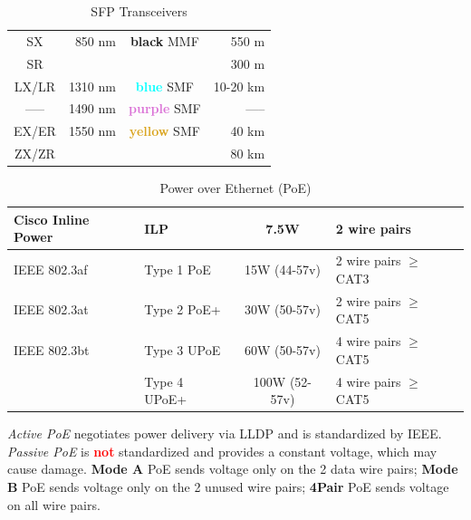 \documentclass[12pt]{article}
\newcommand{\textcolorbf}[2]{\textcolor{#1} {\textbf{#2}}}
\begin{document}
	\begin{table}[H]
	\centering
	\caption{SFP Transceivers \label{tab:SFP}}
	\begin{tabular}{| c | r | c | r |}
	\hline
	SX		& 850 nm		& \textbf{black} MMF				& 550 m\\
	SR		&			&							& 300 m\\\hline
	LX/LR		& 1310 nm		& \textcolorbf{Cyan}{blue} SMF		& 10-20 km\\\hline
	----- 		& 1490 nm		& \textcolorbf{Orchid}{purple} SMF 		& -----\\\hline
	EX/ER 	& 1550 nm		& \textcolorbf{Goldenrod}{yellow} SMF 	& 40 km\\
	ZX/ZR	&			&							& 80 km\\\hline
	\end{tabular}\end{table}

	\begin{table}[H]
	\centering
	\caption{Power over Ethernet (PoE) \label{tab:POE}}
	\begin{tabular}{| l  l | c | l |}
	\hline
	Cisco Inline Power	& ILP			& 7.5W			& 2 wire pairs\\\hline
	IEEE 802.3af			& Type 1 PoE	& 15W (44-57v)		& 2 wire pairs $\ge$ CAT3\\\hline
	IEEE 802.3at			& Type 2 PoE+	& 30W (50-57v)		& 2 wire pairs $\ge$ CAT5\\\hline
	IEEE 802.3bt 		& Type 3 UPoE	& 60W (50-57v) 		& 4 wire pairs $\ge$ CAT5\\
					& Type 4 UPoE+	& 100W (52-57v)		& 4 wire pairs $\ge$ CAT5\\\hline
	\end{tabular}\end{table}
	\textit{Active PoE} negotiates power delivery via LLDP and is standardized by IEEE. \textit{Passive PoE} is \textcolorbf{red}{not} standardized and provides a constant voltage, which may cause damage. \textbf{Mode A} PoE sends voltage only on the 2 data wire pairs; \textbf{Mode B} PoE sends voltage only on the 2 unused wire pairs; \textbf{4Pair} PoE sends voltage on all wire pairs.





\end{document}
